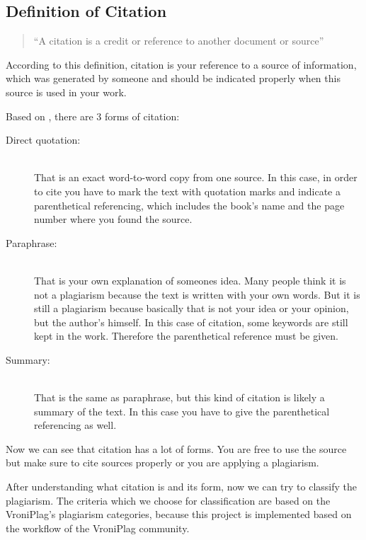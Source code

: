 \subsection{Definition of Citation}

\begin{quote}\enquote{A citation is a credit or reference to another document or source}\\ \citep{wiki:Citation}\end{quote}

According to this definition, citation is your reference to a source of information, which was generated by someone 
and should be indicated properly when this source is used in your work.

Based on \citet{Wiredprof2010}, there are 3 forms of citation:

\begin{description}
\item[Direct quotation:] \hfill \\
That is an exact word-to-word copy from one source. In this case, in order to cite you have to mark 
the text with quotation marks and indicate a  parenthetical referencing, which includes the book’s name and the page 
number where you found the source.
\item[Paraphrase:] \hfill \\
That is your own explanation of someones idea. Many people think it is not a plagiarism because the text 
is written with your own words. But it is still a plagiarism because basically that is not your idea or your opinion, 
but the author’s himself. In this case of citation, some keywords are still kept in the work. Therefore the 
parenthetical reference must be given.
\item[Summary:] \hfill \\
That is the same as paraphrase, but this kind of citation is likely a summary of the text. In this case you 
have to give the parenthetical referencing as well.
\end{description}

Now we can see that citation has a lot of forms. You are free to use the source but make sure to cite sources properly 
or you are applying a plagiarism.

After understanding what citation is and its form, now we can try to classify the plagiarism. The criteria which we 
choose for classification are based on the VroniPlag’s plagiarism categories, because this project is implemented 
based on the workflow of the VroniPlag community. 

